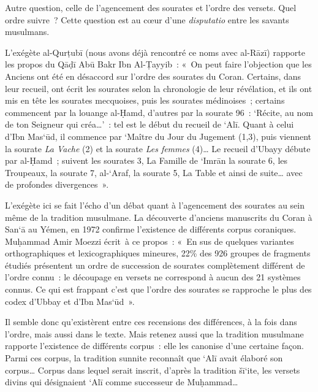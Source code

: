 
Autre question, celle de l'agencement des sourates et l'ordre des
versets. Quel ordre suivre~? Cette question est au cœur d'une
\emph{disputatio} entre les savants musulmans.

L'exégète al-Qurṭubī (nous avons déjà rencontré ce noms avec al-Rāzī)
rapporte les propos du Qāḍī Abū Bakr Ibn Al-Ṭayyib~: «~On peut faire
l'objection que les Anciens ont été en désaccord sur l'ordre des
sourates du Coran. Certains, dans leur recueil, ont écrit les sourates
selon la chronologie de leur révélation, et ils ont mis en tête les
sourates mecquoises, puis les sourates médinoises~; certains commencent
par la louange al-Ḥamd, d'autres par la sourate 96~: `Récite, au nom de
ton Seigneur qui créa\ldots'~: tel est le début du recueil de `Alī.
Quant à celui d'Ibn Mas`ūd, il commence par `Maître du Jour du Jugement
(1,3), puis viennent la sourate \emph{La Vache} (2) et la sourate
\emph{Les femmes} (4)\ldots{} Le recueil d'Ubayy débute par al-Ḥamd~;
suivent les sourates 3, La Famille de `Imrān la sourate 6, les
Troupeaux, la sourate 7, al-`Araf, la sourate 5, La Table et ainsi de
suite\ldots{} avec de profondes divergences~».

L'exégète ici se fait l'écho d'un débat quant à l'agencement des
sourates au sein même de la tradition musulmane. La découverte d'anciens
manuscrits du Coran à San`ā au Yémen, en 1972 confirme l'existence de
différents corpus coraniques. Muḥammad Amir Moezzi écrit~à ce propos~:
«~En sus de quelques variantes orthographiques et lexicographiques
mineures, 22\% des 926 groupes de fragments étudiés présentent un ordre
de succession de sourates complètement différent de l'ordre connu~: le
découpage en versets ne correspond à aucun des 21 systèmes connus. Ce
qui est frappant c'est que l'ordre des sourates se rapproche le plus des
codex d'Ubbay et d'Ibn Mas`ūd~».

Il semble donc qu'existèrent entre ces recensions des différences, à la
fois dans l'ordre, mais aussi dans le texte. Mais retenez aussi que la
tradition musulmane rapporte l'existence de différents corpus~: elle les
canonise d'une certaine façon. Parmi ces corpus, la tradition sunnite
reconnaît que `Alī avait élaboré son corpus\ldots{} Corpus dans lequel
serait inscrit, d'après la tradition šī`ite, les versets divins qui
désignaient `Alī comme successeur de Muḥammad\ldots{}

